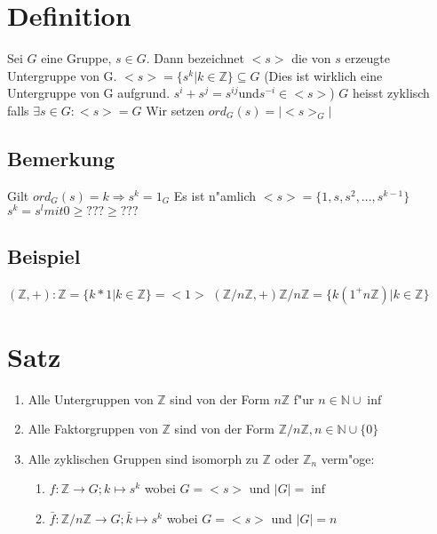 \documentclass[12pt,a4paper,ngerman]{scrreprt}
\begin{document}
\section{Definition}
Sei $G$ eine Gruppe, $s \in G$. 
Dann bezeichnet $<s>$ die von $s$ erzeugte Untergruppe von G. 
$<s> = \{s^k | k \in \mathbb{Z}\} \subseteq G$ 
(Dies ist wirklich eine Untergruppe von G aufgrund. $s^i + s^j = s^{ij} $und$ s^{-i} \in <s>$)
$G$ heisst zyklisch falls $\exists s \in G: <\!s\!>=G$
Wir setzen $ord_G(s) = |<\!s\!>_G|$

\subsection{Bemerkung}
Gilt $ord_G(s) = k \Rightarrow s^k = 1_G$
Es ist n"amlich $<s> = \{1,s,s^2, ... , s^{k-1}\}$
$s^k = s^l mit 0 \geq ??? \geq ???$

\subsection{Beispiel}
$(\mathbb{Z}, +): \mathbb{Z} = \{k*1 | k \in \mathbb{Z} \} = <1>$
$(\mathbb{Z} / n\mathbb{Z} , +) \mathbb{Z} / n\mathbb{Z} = \{k (1^+ n \mathbb{Z}) | k \in \mathbb{Z}\}$

\section{Satz}
\begin{enumerate}[(1)]
\item Alle Untergruppen von $\mathbb{Z}$  sind von der Form 
$n\mathbb{Z}$ f"ur $n \in \mathbb{N} \cup \inf$
\item Alle Faktorgruppen von $\mathbb{Z}$ sind von der Form 
$\mathbb{Z} / n\mathbb{Z}, n \in \mathbb{N} \cup \{0\}$
\item Alle zyklischen Gruppen sind isomorph zu $\mathbb{Z}$ oder $\mathbb{Z}_n$ verm"oge:
\begin{enumerate}[]
\item $ f: \mathbb{Z} \to G; k \mapsto s^k $ wobei $G = <s>$ und $|G| = \inf$
\item $ \bar{f}: \mathbb{Z}/n\mathbb{Z} \to G ; \bar{k} \mapsto s^k$ 
wobei $G = <s>$ und $|G| = n$
\end{enumerate}
\end{enumerate}
\end{document}
